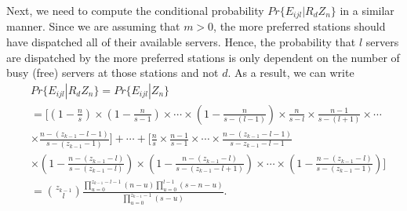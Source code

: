 \documentclass[11pt]{article}\topmargin 0mm
\begin{document}
Next, we need to compute the conditional probability
$Pr\{E_{ijl}|R_d Z_n\}$ in a similar manner. Since we are
assuming that $m>0$, the more preferred stations should have
dispatched all of their available servers. Hence, the
probability that $l$ servers are dispatched by the more
preferred stations is only dependent on the number of busy
(free) servers at those stations and not $d$. As a result, we
can write
\begin{equation}
\label{eq:P(Cijm)}
\begin{split}
& Pr\{E_{ijl}|R_d Z_n\} = Pr\{E_{ijl}|Z_n\} \\
& = \Biggl[\left(1-\frac{n}{s}\right)\times \left(1-\frac{n}{s-1}\right)\times \cdots \times \left(1-\frac{n}{s-(l-1)}\right) \times \frac{n}{s-l} \times \frac{n-1}{s-(l+1)} \times \cdots \\
& \times \frac{n-(z_{k-1}-l-1)}{s-(z_{k-1}-1)}\Biggr] + \cdots + \Biggl[\frac{n}{s}\times \frac{n-1}{s-1}\times \cdots \times \frac{n-(z_{k-1}-l-1)}{s-z_{k-1}-l-1} \\
& \times \left(1-\frac{n-(z_{k-1}-l)}{s-(z_{k-1}-l)}\right) \times \left(1-\frac{n-(z_{k-1}-l)}{s-(z_{k-1}-l+1)}\right) \times \cdots \times \left(1-\frac{n-(z_{k-1}-l)}{s-(z_{k-1}-1)}\right)\Biggr] \\
& = {z_{k-1} \choose l} \frac{\prod_{u=0}^{z_{k-1}-l-1}(n-u) \prod_{u=0}^{l-1}(s-n-u)}{\prod_{u=0}^{z_{k-1}-1}(s-u)}.
\end{split}
\end{equation}
\end{document}

